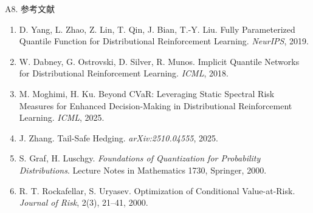 \documentclass[aspectratio=169, 10pt]{beamer}
\begin{document}
\begin{frame}{A8. 参考文献}
  \footnotesize
  \begin{enumerate}
    \item D. Yang, L. Zhao, Z. Lin, T. Qin, J. Bian, T.-Y. Liu.
          Fully Parameterized Quantile Function for Distributional Reinforcement Learning. \textit{NeurIPS}, 2019.
    \item W. Dabney, G. Ostrovski, D. Silver, R. Munos.
          Implicit Quantile Networks for Distributional Reinforcement Learning. \textit{ICML}, 2018.
    \item M. Moghimi, H. Ku. Beyond CVaR: Leveraging Static Spectral Risk Measures for Enhanced Decision-Making in Distributional Reinforcement Learning. \textit{ICML}, 2025.
    \item J. Zhang. Tail-Safe Hedging. \textit{arXiv:2510.04555}, 2025.
    \item S. Graf, H. Luschgy. \textit{Foundations of Quantization for Probability Distributions}. Lecture Notes in Mathematics 1730, Springer, 2000.
    \item R. T. Rockafellar, S. Uryasev. Optimization of Conditional Value-at-Risk. \textit{Journal of Risk}, 2(3), 21--41, 2000.
  \end{enumerate}
\end{frame}
\end{document}
